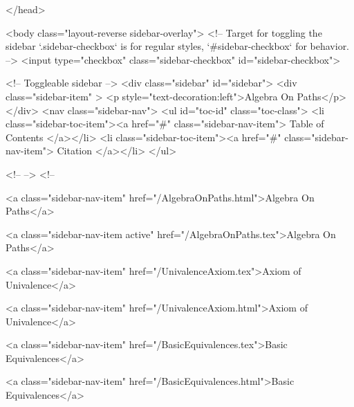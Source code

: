   
</head>




  <body class="layout-reverse sidebar-overlay">
    <!-- Target for toggling the sidebar `.sidebar-checkbox` is for regular
     styles, `#sidebar-checkbox` for behavior. -->
<input type="checkbox" class="sidebar-checkbox" id="sidebar-checkbox">

<!-- Toggleable sidebar -->
<div class="sidebar" id="sidebar">
  <div class="sidebar-item" >
    <p style="text-decoration:left">Algebra On Paths</p>
  </div>
  <nav class="sidebar-nav">
    <ul id="toc-id" class="toc-class">
  <li class="sidebar-toc-item"><a href="#" class="sidebar-nav-item"> Table of Contents </a></li>
  <li class="sidebar-toc-item"><a href="#" class="sidebar-nav-item"> Citation </a></li>
</ul>


    <!--  -->
    <!-- 
      
    
      
    
      
    
      
    
      
        
      
    
      
        
          <a class="sidebar-nav-item" href="/AlgebraOnPaths.html">Algebra On Paths</a>
        
      
    
      
        
          <a class="sidebar-nav-item active" href="/AlgebraOnPaths.tex">Algebra On Paths</a>
        
      
    
      
        
          <a class="sidebar-nav-item" href="/UnivalenceAxiom.tex">Axiom of Univalence</a>
        
      
    
      
        
          <a class="sidebar-nav-item" href="/UnivalenceAxiom.html">Axiom of Univalence</a>
        
      
    
      
        
          <a class="sidebar-nav-item" href="/BasicEquivalences.tex">Basic Equivalences</a>
        
      
    
      
        
          <a class="sidebar-nav-item" href="/BasicEquivalences.html">Basic Equivalences</a>
        
